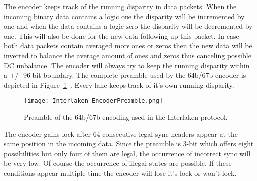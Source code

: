 	The encoder keeps track of the running disparity in data packets. When the incoming binary data contains a logic one the disparity will be incremented by one and when the data contains a logic zero the disparity will be decremented by one. This will also be done for the new data following up this packet. In case both data packets contain averaged more ones or zeros then the new data will be inverted to balance the average amount of ones and zeros thus canceling possible DC unbalance. The encoder will always try to keep the running disparity within a +/- 96-bit boundary. The complete preamble used by the 64b/67b encoder is depicted in Figure~\ref{Fig:Interlaken_EncoderPreamble}~\cite{InterlakenProtocol}. Every lane keeps track of it's own running disparity.
	
	\begin{figure}[H]
		\centering
		\texttt{[image: Interlaken\_EncoderPreamble.png]}	
		\caption{Preamble of the 64b/67b encoding used in the Interlaken protocol.}
		\label{Fig:Interlaken_EncoderPreamble}
	\end{figure}
	
	The encoder gains lock after 64 consecutive legal sync headers appear at the same position in the incoming data. Since the preamble is 3-bit which offers eight possibilities but only four of them are legal, the occurrence of incorrect sync will be very low.
	Of course the occurrence of illegal states are possible. If these conditions appear multiple time the encoder will lose it's lock or won't lock.
\newpage
